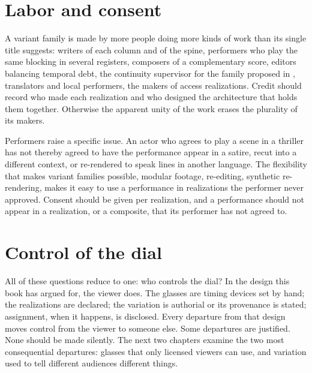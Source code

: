 \section{Labor and consent}

A variant family is made by more people doing more kinds of work than its single title suggests: writers of each column and of the spine, performers who play the same blocking in several registers, composers of a complementary score, editors balancing temporal debt, the continuity supervisor for the family proposed in , translators and local performers, the makers of access realizations. Credit should record who made each realization and who designed the architecture that holds them together. Otherwise the apparent unity of the work erases the plurality of its makers.

Performers raise a specific issue. An actor who agrees to play a scene in a thriller has not thereby agreed to have the performance appear in a satire, recut into a different context, or re-rendered to speak lines in another language. The flexibility that makes variant families possible, modular footage, re-editing, synthetic re-rendering, makes it easy to use a performance in realizations the performer never approved. Consent should be given per realization, and a performance should not appear in a realization, or a composite, that its performer has not agreed to.

\section{Control of the dial}

All of these questions reduce to one: who controls the dial? In the design this book has argued for, the viewer does. The glasses are timing devices set by hand; the realizations are declared; the variation is authorial or its provenance is stated; assignment, when it happens, is disclosed. Every departure from that design moves control from the viewer to someone else. Some departures are justified. None should be made silently. The next two chapters examine the two most consequential departures: glasses that only licensed viewers can use, and variation used to tell different audiences different things.
